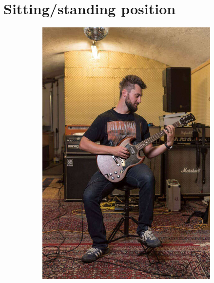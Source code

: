 \section{Sitting/standing position}

\begin{figure}[h]
  \begin{subfigure}[b]{0.45\textwidth}
    \includegraphics[width=\textwidth]{../../Images/Letty_Guitar-Shooting_sitting.jpg}
    \caption{}
    \label{fig:positin_sitting}
  \end{subfigure}
  \hfill
  \begin{subfigure}[b]{0.45\textwidth}

\end{subfigure}
\end{figure}
